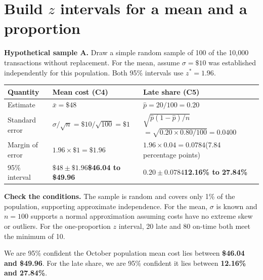 \clearpage
\section{Build \texorpdfstring{\(z\)}{z} intervals for a mean and a proportion}

\textbf{Hypothetical sample A.} Draw a simple random sample of 100 of the 10,000 transactions without replacement. For the mean, assume \(\sigma=\$10\) was established independently for this population. Both 95\% intervals use \(z^*=1.96\).


{\small\noindent
\begin{tabularx}{\linewidth}{@{}lYY@{}}
  \toprule
  \textbf{Quantity} & \textbf{Mean cost (C4)} & \textbf{Late share (C5)}\\
  \midrule
  Estimate & \(\bar{x}=\$48\) & \(\hat{p}=20/100=0.20\)\\[1pt]
  Standard error
    & \(\sigma/\sqrt{n}=\$10/\sqrt{100}=\$1\)
    & \(\sqrt{\hat{p}(1-\hat{p})/n}\)\newline
      \(=\sqrt{0.20\times 0.80/100}=0.0400\)\\[1pt]
  Margin of error
    & \(1.96\times \$1=\$1.96\)
    & \(1.96\times 0.04=0.0784\)\newline (7.84 percentage points)\\[1pt]
  95\% interval
    & \(\$48\pm \$1.96\)\newline \textbf{\$46.04 to \$49.96}
    & \(0.20\pm 0.0784\)\newline \textbf{12.16\% to 27.84\%}\\
  \bottomrule
\end{tabularx}\par}

\textbf{Check the conditions.} The sample is random and covers only 1\% of the population, supporting approximate independence. For the mean, \(\sigma\) is known and \(n=100\) supports a normal approximation assuming costs have no extreme skew or outliers. For the one-proportion \(z\) interval, 20 late and 80 on-time both meet the minimum of 10.

We are 95\% confident the October population mean cost lies between \textbf{\$46.04 and \$49.96}. For the late share, we are 95\% confident it lies between \textbf{12.16\% and 27.84\%}.


